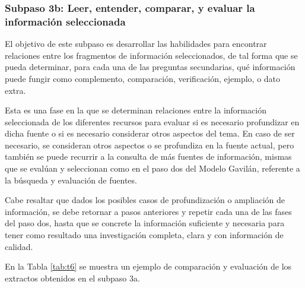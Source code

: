 
\subsubsection{Subpaso 3b: Leer, entender, comparar, y evaluar la información seleccionada}
\label{secPaso3bCap2}

El objetivo de este subpaso es desarrollar las habilidades para encontrar relaciones entre los fragmentos de información seleccionados, de tal forma que se pueda determinar, para cada una de las preguntas secundarias, qué información puede fungir como complemento, comparación, verificación, ejemplo, o dato extra.

Esta es una fase en la que se determinan relaciones entre la información seleccionada de los diferentes recursos para evaluar si es necesario profundizar en dicha fuente o si es necesario considerar otros aspectos del tema. En caso de ser necesario, se consideran otros aspectos o se profundiza en la fuente actual, pero también se puede recurrir a la consulta de más fuentes de información, mismas que se evalúan y seleccionan como en el paso dos del Modelo Gavilán, referente a la búsqueda y evaluación de fuentes.

Cabe resaltar que dados los posibles casos de profundización o ampliación de información, se debe retornar a pasos anteriores y repetir cada una de las fases del paso dos, hasta que se concrete la información suficiente y necesaria para tener como resultado una investigación completa, clara y con información de calidad.

En la Tabla \ref{tab:t6} se muestra un ejemplo de comparación y evaluación de los extractos obtenidos en el subpaso 3a.

